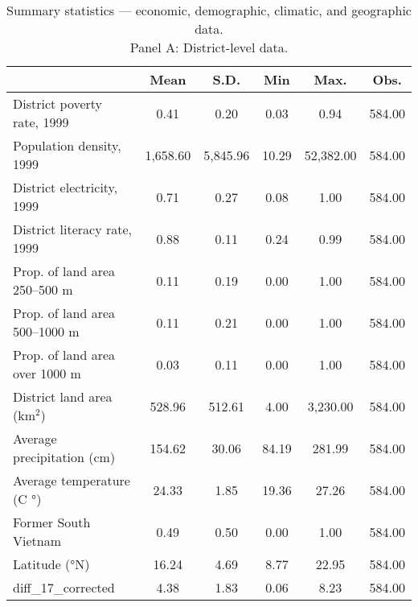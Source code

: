 \begin{table}[htbp]\centering
\def\sym#1{\ifmmode^{#1}\else\(^{#1}\)\fi}
\caption{Summary statistics — economic, demographic, climatic, and geographic data. \\ Panel A: District-level data.}
\begin{tabular}{l*{1}{ccccc}}
\toprule
                    &        Mean&        S.D.&         Min&        Max.&        Obs.\\
\midrule
District poverty rate, 1999&        0.41&        0.20&        0.03&        0.94&      584.00\\
Population density, 1999&    1,658.60&    5,845.96&       10.29&   52,382.00&      584.00\\
District electricity, 1999&        0.71&        0.27&        0.08&        1.00&      584.00\\
District literacy rate, 1999&        0.88&        0.11&        0.24&        0.99&      584.00\\
Prop. of land area 250–500 m&        0.11&        0.19&        0.00&        1.00&      584.00\\
Prop. of land area 500–1000 m&        0.11&        0.21&        0.00&        1.00&      584.00\\
Prop. of land area over 1000 m&        0.03&        0.11&        0.00&        1.00&      584.00\\
District land area (km$^2$)&      528.96&      512.61&        4.00&    3,230.00&      584.00\\
Average precipitation (cm)&      154.62&       30.06&       84.19&      281.99&      584.00\\
Average temperature (C $°$)&       24.33&        1.85&       19.36&       27.26&      584.00\\
Former South Vietnam&        0.49&        0.50&        0.00&        1.00&      584.00\\
Latitude (°N)       &       16.24&        4.69&        8.77&       22.95&      584.00\\
diff\_17\_corrected   &        4.38&        1.83&        0.06&        8.23&      584.00\\
\bottomrule
\end{tabular}
\end{table}
